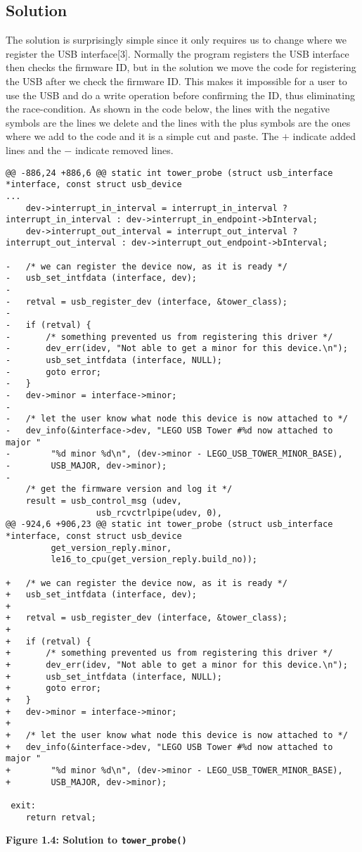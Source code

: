 \documentclass[12pt]{article}
\begin{document}
\subsection{Solution}
The solution is surprisingly simple since it only requires us to change where we register the USB interface[3]. Normally the program registers the USB interface then checks the firmware ID, but in the solution we move the code for registering the USB after we check the firmware ID. This makes it impossible for a user to use the USB and do a write operation before confirming the ID, thus eliminating the race-condition. As shown in the code below, the lines with the negative symbols are the lines we delete and the lines with the plus symbols are the ones where we add to the code and it is a simple cut and paste. The $+$ indicate added lines and the $-$ indicate removed lines.
\begin{lstlisting}[style=CStyle]
@@ -886,24 +886,6 @@ static int tower_probe (struct usb_interface *interface, const struct usb_device
...
 	dev->interrupt_in_interval = interrupt_in_interval ? interrupt_in_interval : dev->interrupt_in_endpoint->bInterval;
 	dev->interrupt_out_interval = interrupt_out_interval ? interrupt_out_interval : dev->interrupt_out_endpoint->bInterval;
 
-	/* we can register the device now, as it is ready */
-	usb_set_intfdata (interface, dev);
-
-	retval = usb_register_dev (interface, &tower_class);
-
-	if (retval) {
-		/* something prevented us from registering this driver */
-		dev_err(idev, "Not able to get a minor for this device.\n");
-		usb_set_intfdata (interface, NULL);
-		goto error;
-	}
-	dev->minor = interface->minor;
-
-	/* let the user know what node this device is now attached to */
-	dev_info(&interface->dev, "LEGO USB Tower #%d now attached to major "
-		 "%d minor %d\n", (dev->minor - LEGO_USB_TOWER_MINOR_BASE),
-		 USB_MAJOR, dev->minor);
-
 	/* get the firmware version and log it */
 	result = usb_control_msg (udev,
 				  usb_rcvctrlpipe(udev, 0),
@@ -924,6 +906,23 @@ static int tower_probe (struct usb_interface *interface, const struct usb_device
 		 get_version_reply.minor,
 		 le16_to_cpu(get_version_reply.build_no));
 
+	/* we can register the device now, as it is ready */
+	usb_set_intfdata (interface, dev);
+
+	retval = usb_register_dev (interface, &tower_class);
+
+	if (retval) {
+		/* something prevented us from registering this driver */
+		dev_err(idev, "Not able to get a minor for this device.\n");
+		usb_set_intfdata (interface, NULL);
+		goto error;
+	}
+	dev->minor = interface->minor;
+
+	/* let the user know what node this device is now attached to */
+	dev_info(&interface->dev, "LEGO USB Tower #%d now attached to major "
+		 "%d minor %d\n", (dev->minor - LEGO_USB_TOWER_MINOR_BASE),
+		 USB_MAJOR, dev->minor);
 
 exit:
 	return retval;
\end{lstlisting}
\centerline{\textbf{Figure 1.4: Solution to \texttt{tower\_probe()}}}
\vspace{12pt}
\end{document}
